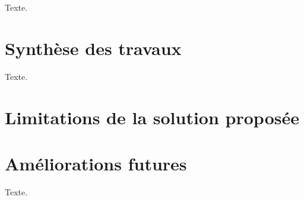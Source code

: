 \label{sec:Conclusion}
Texte.

\section{Synthèse des travaux}
Texte.

\section{Limitations de la solution proposée}\label{sec:Limitations}

\section{Améliorations futures}
Texte.

